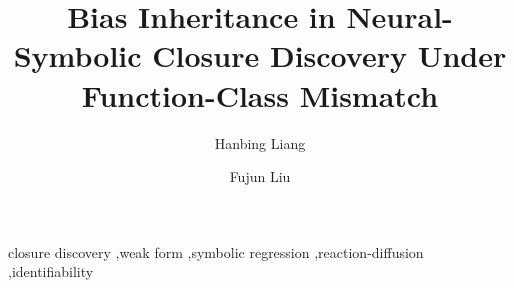 \documentclass[preprint,12pt]{elsarticle}
\begin{document}
\begin{frontmatter}

\title{Bias Inheritance in Neural-Symbolic Closure Discovery Under Function-Class Mismatch}

\author[aff1]{Hanbing Liang}
\author[aff1]{Fujun Liu}
\address[aff1]{Nanophotonics and Biophotonics Key Laboratory of Jilin Province, School of Physics, Changchun University of Science and Technology, Changchun 130022, P.R. China}



\begin{keyword}
closure discovery \sep weak form \sep symbolic regression \sep reaction-diffusion \sep identifiability
\end{keyword}

\end{frontmatter}









\nocite{*}



\appendix

\end{document}
